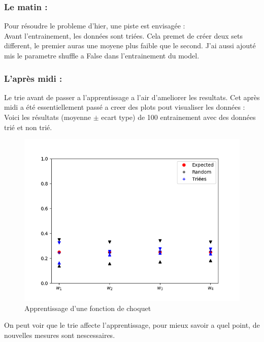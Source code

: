 \subsubsection*{Le matin :}
Pour résoudre le probleme d'hier, une piste est envisagée :\\
    Avant l'entrainement, les données sont triées.
    Cela premet de créer deux sets different,
    le premier auras une moyene plus faible que le second.
    J'ai aussi ajouté mis le parametre shuffle a False dans l'entrainement du model.


\subsubsection*{L'après midi :}
Le trie avant de passer a l'apprentissage a l'air d'ameliorer les resultats.
Cet après midi a été essentiellement passé a creer des plots pout visualiser les données :
Voici les résultats (moyenne $\pm$ ecart type) de 100 entrainement avec des données trié et non trié.
\begin{figure}[H]
    \center
    \includegraphics[height=\grand]{sources/data/pbtrie/graph}
	\caption{Apprentissage d'une fonction de choquet}
	\label{pbtrie}
\end{figure}

On peut voir que le trie affecte l'apprentissage, pour mieux savoir a quel point, de nouvelles mesures sont nescessaires.
